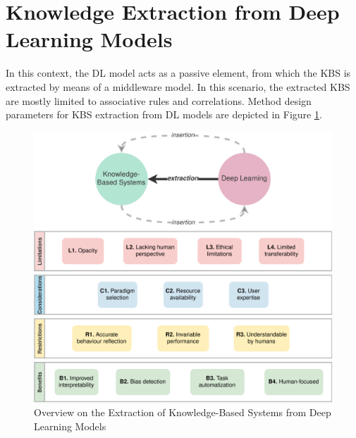 \section{Knowledge Extraction from Deep Learning Models}\label{6_sec:kbs_extra_dl_method}
In this context, the DL model acts as a passive element, from which the KBS is extracted by means of a middleware model. In this scenario, the extracted KBS are mostly limited to associative rules and correlations. Method design parameters for KBS extraction from DL models are depicted in Figure \ref{fig:kbs_extra_dl_overview}.
\begin{figure}[t]
    \centering
    \includegraphics[width=\linewidth]{6_kbsextractiondl/figures/K_extraction_DL.eps}
    \caption{Overview on the Extraction of Knowledge-Based Systems from Deep Learning Models}
    \label{fig:kbs_extra_dl_overview}
\end{figure}

